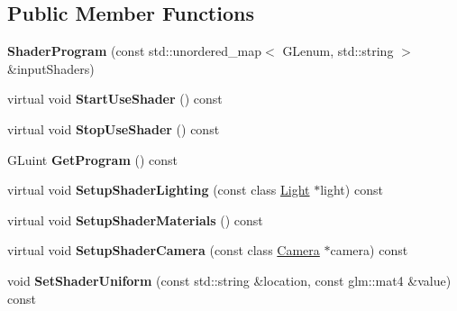 \subsection*{Public Member Functions}
\begin{DoxyCompactItemize}
\item 
\hypertarget{class_shader_program_aba2db5734b2f70cc34078126ad279588}{}{\bfseries Shader\+Program} (const std\+::unordered\+\_\+map$<$ G\+Lenum, std\+::string $>$ \&input\+Shaders)\label{class_shader_program_aba2db5734b2f70cc34078126ad279588}

\item 
\hypertarget{class_shader_program_a906b0232f27663b28cc800ac2851541f}{}virtual void {\bfseries Start\+Use\+Shader} () const \label{class_shader_program_a906b0232f27663b28cc800ac2851541f}

\item 
\hypertarget{class_shader_program_a5afb6f91d30b6e197fab0827c416c51f}{}virtual void {\bfseries Stop\+Use\+Shader} () const \label{class_shader_program_a5afb6f91d30b6e197fab0827c416c51f}

\item 
\hypertarget{class_shader_program_a281396edbb786eacf86ae4997a3e90c6}{}G\+Luint {\bfseries Get\+Program} () const \label{class_shader_program_a281396edbb786eacf86ae4997a3e90c6}

\item 
\hypertarget{class_shader_program_a2f3c1c149aa0988e07e0a513c69c1770}{}virtual void {\bfseries Setup\+Shader\+Lighting} (const class \hyperlink{class_light}{Light} $\ast$light) const \label{class_shader_program_a2f3c1c149aa0988e07e0a513c69c1770}

\item 
\hypertarget{class_shader_program_ad7a595a10717c6051d6c582c850c4ed7}{}virtual void {\bfseries Setup\+Shader\+Materials} () const \label{class_shader_program_ad7a595a10717c6051d6c582c850c4ed7}

\item 
\hypertarget{class_shader_program_a75e888f885b9028847e2d9556a754170}{}virtual void {\bfseries Setup\+Shader\+Camera} (const class \hyperlink{class_camera}{Camera} $\ast$camera) const \label{class_shader_program_a75e888f885b9028847e2d9556a754170}

\item 
\hypertarget{class_shader_program_a47298abb4ffc8d75f88b3d603aa989f9}{}void {\bfseries Set\+Shader\+Uniform} (const std\+::string \&location, const glm\+::mat4 \&value) const \label{class_shader_program_a47298abb4ffc8d75f88b3d603aa989f9}


\end{DoxyCompactItemize}
